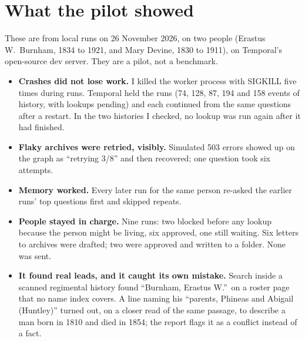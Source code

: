 \documentclass[11pt]{article}
\begin{document}
\section*{What the pilot showed}
These are from local runs on 26 November 2026, on two people (Erastus W.\ Burnham, 1834 to 1921, and Mary Devine, 1830 to 1911), on Temporal's open-source dev server. They are a pilot, not a benchmark.
\begin{itemize}
\item \textbf{Crashes did not lose work.} I killed the worker process with SIGKILL five times during runs. Temporal held the runs (74, 128, 87, 194 and 158 events of history, with lookups pending) and each continued from the same questions after a restart. In the two histories I checked, no lookup was run again after it had finished.
\item \textbf{Flaky archives were retried, visibly.} Simulated 503 errors showed up on the graph as ``retrying 3/8'' and then recovered; one question took six attempts.
\item \textbf{Memory worked.} Every later run for the same person re-asked the earlier runs' top questions first and skipped repeats.
\item \textbf{People stayed in charge.} Nine runs: two blocked before any lookup because the person might be living, six approved, one still waiting. Six letters to archives were drafted; two were approved and written to a folder. None was sent.
\item \textbf{It found real leads, and it caught its own mistake.} Search inside a scanned regimental history found ``Burnham, Erastus W.''\ on a roster page that no name index covers. A line naming his ``parents, Phineas and Abigail (Huntley)'' turned out, on a closer read of the same passage, to describe a man born in 1810 and died in 1854; the report flags it as a conflict instead of a fact.
\end{itemize}
\end{document}
